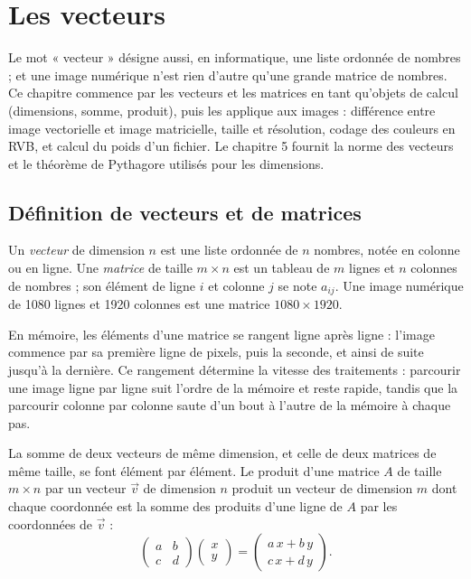 \chapter{Les vecteurs}

\begin{quelqueslignes}
Le mot « vecteur » désigne aussi, en informatique, une liste ordonnée de nombres ; et une image numérique n'est rien d'autre qu'une grande matrice de nombres. Ce chapitre commence par les vecteurs et les matrices en tant qu'objets de calcul (dimensions, somme, produit), puis les applique aux images : différence entre image vectorielle et image matricielle, taille et résolution, codage des couleurs en RVB, et calcul du poids d'un fichier. Le chapitre 5 fournit la norme des vecteurs et le théorème de Pythagore utilisés pour les dimensions.
\end{quelqueslignes}

\section{Définition de vecteurs et de matrices}

\begin{definition}
Un \emph{vecteur} de dimension $n$ est une liste ordonnée de $n$ nombres, notée en colonne ou en ligne. Une \emph{matrice} de taille $m \times n$ est un tableau de $m$ lignes et $n$ colonnes de nombres ; son élément de ligne $i$ et colonne $j$ se note $a_{ij}$. Une image numérique de 1080 lignes et 1920 colonnes est une matrice $1080 \times 1920$.
\end{definition}

En mémoire, les éléments d'une matrice se rangent ligne après ligne : l'image commence par sa première ligne de pixels, puis la seconde, et ainsi de suite jusqu'à la dernière. Ce rangement détermine la vitesse des traitements : parcourir une image ligne par ligne suit l'ordre de la mémoire et reste rapide, tandis que la parcourir colonne par colonne saute d'un bout à l'autre de la mémoire à chaque pas.

La somme de deux vecteurs de même dimension, et celle de deux matrices de même taille, se font élément par élément. Le produit d'une matrice $A$ de taille $m \times n$ par un vecteur $\vec{v}$ de dimension $n$ produit un vecteur de dimension $m$ dont chaque coordonnée est la somme des produits d'une ligne de $A$ par les coordonnées de $\vec{v}$ :
\[
\begin{pmatrix} a & b \\ c & d \end{pmatrix}
\begin{pmatrix} x \\ y \end{pmatrix}
=
\begin{pmatrix} a\,x + b\,y \\ c\,x + d\,y \end{pmatrix} .
\]

